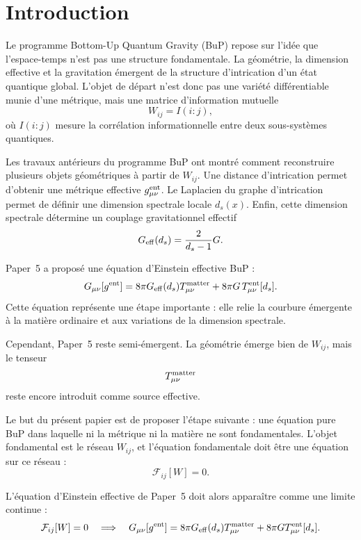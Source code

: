 \documentclass[11pt,a4paper]{article}
\begin{document}
\tableofcontents

\section{Introduction}

Le programme Bottom-Up Quantum Gravity (BuP) repose sur l'idée que l'espace-temps n'est pas une structure fondamentale. La géométrie, la dimension effective et la gravitation émergent de la structure d'intrication d'un état quantique global. L'objet de départ n'est donc pas une variété différentiable munie d'une métrique, mais une matrice d'information mutuelle
\[
W_{ij}=I(i:j),
\]
où \(I(i:j)\) mesure la corrélation informationnelle entre deux sous-systèmes quantiques.

Les travaux antérieurs du programme BuP ont montré comment reconstruire plusieurs objets géométriques à partir de \(W_{ij}\). Une distance d'intrication permet d'obtenir une métrique effective \(g_{\mu\nu}^{\rm ent}\). Le Laplacien du graphe d'intrication permet de définir une dimension spectrale locale \(d_s(x)\). Enfin, cette dimension spectrale détermine un couplage gravitationnel effectif
\[
G_{\rm eff}(d_s)
=
\frac{2}{d_s-1}G.
\]

Paper~5 a proposé une équation d'Einstein effective BuP :
\[
G_{\mu\nu}[g^{\rm ent}]
=
8\pi G_{\rm eff}(d_s)T_{\mu\nu}^{\rm matter}
+
8\pi G\,T_{\mu\nu}^{\rm ent}[d_s].
\]
Cette équation représente une étape importante : elle relie la courbure émergente à la matière ordinaire et aux variations de la dimension spectrale.

Cependant, Paper~5 reste semi-émergent. La géométrie émerge bien de \(W_{ij}\), mais le tenseur
\[
T_{\mu\nu}^{\rm matter}
\]
reste encore introduit comme source effective.

Le but du présent papier est de proposer l'étape suivante : une équation pure BuP dans laquelle ni la métrique ni la matière ne sont fondamentales. L'objet fondamental est le réseau \(W_{ij}\), et l'équation fondamentale doit être une équation sur ce réseau :
\[
\boxed{
\mathcal{F}_{ij}[W]=0.
}
\]

L'équation d'Einstein effective de Paper~5 doit alors apparaître comme une limite continue :
\[
\mathcal{F}_{ij}[W]=0
\quad\Longrightarrow\quad
G_{\mu\nu}[g^{\rm ent}]
=
8\pi G_{\rm eff}(d_s)T_{\mu\nu}^{\rm matter}
+
8\pi G T_{\mu\nu}^{\rm ent}[d_s].
\]
\end{document}
